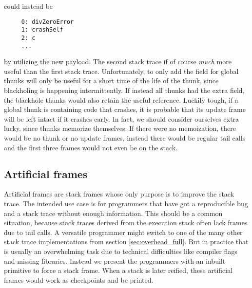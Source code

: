 could instead be

\begin{verbatim}
     0: divZeroError
     1: crashSelf
     2: c
     ...
\end{verbatim}

by utilizing the new payload. The second stack trace if of course
\emph{much} more useful than the first stack trace. Unfortunately,
to only add the field for global thunks will only be useful for a
short time of the life of the thunk, since blackholing is happening
intermittently. If instead all thunks had the extra field, the blackhole
thunks would also retain the useful reference. Luckily tough, if a
global thunk is containing code that crashes, it is probable that its
update frame will be left intact if it crashes early. In
fact, we should consider ourselves extra lucky, since thunks
memorize themselves. If there were no memoization,
there would be no thunk or no update frames, instead there would be
regular tail calls and the first three frames would not even be on the stack.

\subsection{Artificial frames}

Artificial frames are stack frames whose only purpose is to improve
the stack trace. The intended use case is for programmers that have
got a reproducible bug and a stack trace without enough information.
This should be a common situation, because stack traces derived from the
execution stack often lack frames due to tail calls. A versatile
programmer might switch to one of the many other stack trace
implementations from section \ref{sec:overhead_full}.
But in practice that is usually an overwhelming task
due to technical difficulties like compiler flags and missing libraries. Instead we present
the programmers with an inbuilt primitive to force a stack frame.
When a stack is later reified, these artificial frames would work as
checkpoints and be printed.

